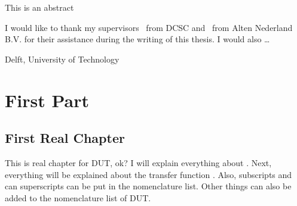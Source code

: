 \documentclass[a4paper,11pt]{mscThesis}
\begin{document}
%
\frontmatter %
%
 \maketitle
%

    This is an abstract
    \cleardoublepage
%

    I would like to thank my supervisors \mscreaderone\ from DCSC and \mscreadertwo\ from Alten Nederland B.V. for their assistance during the writing
    of this thesis. I would also \ldots
    \vspace*{15mm}

    \noindent
    Delft, University of Technology \hfill \mscname\\
    \mscdate

%
    \tocloflot
%
    \printnomencl %
%
    \begin{acronym}[XXXXX]%
    \end{acronym}%
    \cleardoublepage%
%
    \printindex%
    \cleardoublepage%
%
%
\mainmatter
%







%
    \part{First Part}

    \chapter{First Real Chapter}

    This is real chapter for \ac{DUT}, ok? I will explain everything about . Next, everything
    will be explained about the transfer function . Also, subscripts and can
    superscripts can be put in the nomenclature  list.   Other things can also
    be added to the nomenclature list of \ac{DUT}.  
\end{document}
